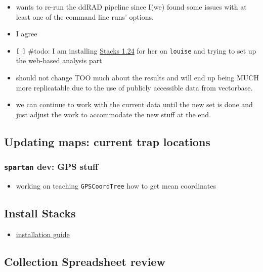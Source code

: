 \documentclass[letterpaper]{scrartcl}
\begin{document}
\begin{itemize}
\itemsep1pt\parskip0pt
\item
  wants to re-run the ddRAD pipeline since I(we) found some issues with
  at least one of the command line runs' options.
\item
  I agree
\item
  \texttt{{[}} \texttt{{]}} \#todo: I am installing
  \href{http://creskolab.uoregon.edu/stacks/}{Stacks 1.24} for her on
  \texttt{louise} and trying to set up the web-based analysis part
\item
  should not change TOO much about the results and will end up being
  MUCH more replicatable due to the use of publicly accessible data from
  vectorbase.
\item
  we can continue to work with the current data until the new set is
  done and just adjust the work to accommodate the new stuff at the end.
\end{itemize}

\subsection{Updating maps: current trap
locations}\label{updating-maps-current-trap-locations-2}

\subsubsection{\texttt{spartan} dev: GPS
stuff}\label{spartan-dev-gps-stuff-2}

\begin{itemize}
\itemsep1pt\parskip0pt
\item
  working on teaching \texttt{GPSCoordTree} how to get mean coordinates
\end{itemize}

\subsection{Install Stacks}\label{install-stacks}

\begin{itemize}
\itemsep1pt\parskip0pt
\item
  \href{http://creskolab.uoregon.edu/stacks/manual/\#install}{installation
  guide}
\end{itemize}

\subsection{Collection Spreadsheet
review}\label{collection-spreadsheet-review-1}
\end{document}
